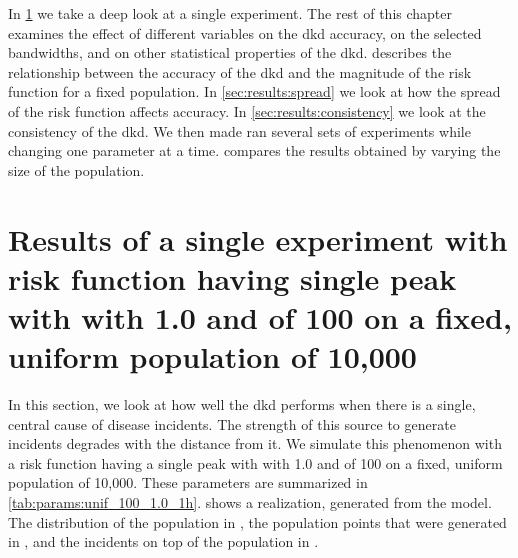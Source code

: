 In \cref{sec:results:unif_100_1.0_1h} we take a deep look at a single experiment.
The rest of this chapter examines the effect of different variables on the \gls{dkd} accuracy, on the selected bandwidths, and on other statistical properties of the \gls{dkd}.
 describes the relationship between the accuracy of the \gls{dkd} and the magnitude of the risk function for a fixed population.
In \cref{sec:results:spread} we look at how the spread of the risk function affects accuracy.
In \cref{sec:results:consistency} we look at the consistency of the \gls{dkd}.
We then made ran several sets of experiments while changing one parameter at a time.
 compares the results obtained by varying the size of the population.

\section[Results of single-peak risk on uniform population]
    {Results of a single experiment with risk function having single peak with with  1.0 and  of 100 on a fixed, uniform population of 10,000}
\label{sec:results:unif_100_1.0_1h}
\graphicspath{{./results/unif_100_1.0_1h/}}
\makeatletter
{}
\makeatother

In this section, we look at how well the \gls{dkd} performs when there is a single, central cause of disease incidents.
The strength of this source to generate incidents degrades with the distance from it.
We simulate this phenomenon with a risk function having a single peak with with  1.0 and  of 100 on a fixed, uniform population of 10,000.
These parameters are summarized in \cref{tab:params:unif_100_1.0_1h}.
 shows a realization, generated from the model.
The distribution of the population in ,
the population points that were generated in ,
and the incidents on top of the population in .

